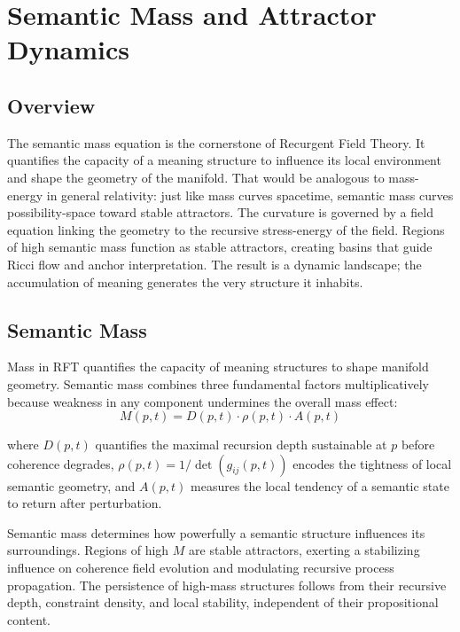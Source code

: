 \chapter{Semantic Mass and Attractor Dynamics}

\section{Overview}

The semantic mass equation is the cornerstone of Recurgent Field Theory. It quantifies the capacity of a meaning structure to influence its local environment and shape the geometry of the manifold. That would be analogous to mass-energy in general relativity: just like mass curves spacetime, semantic mass curves possibility-space toward stable attractors. The curvature is governed by a field equation linking the geometry to the recursive stress-energy of the field. Regions of high semantic mass function as stable attractors, creating basins that guide Ricci flow and anchor interpretation. The result is a dynamic landscape; the accumulation of meaning generates the very structure it inhabits.

\section{Semantic Mass}

Mass in RFT quantifies the capacity of meaning structures to shape manifold geometry. Semantic mass combines three fundamental factors multiplicatively because weakness in any component undermines the overall mass effect:
\begin{equation}
M(p, t) = D(p, t) \cdot \rho(p, t) \cdot A(p, t)
\end{equation}

where \(D(p, t)\) quantifies the maximal recursion depth sustainable at \(p\) before coherence degrades, \(\rho(p, t) = 1/\det(g_{ij}(p, t))\) encodes the tightness of local semantic geometry, and \(A(p, t)\) measures the local tendency of a semantic state to return after perturbation.

Semantic mass determines how powerfully a semantic structure influences its surroundings. Regions of high \(M\) are stable attractors, exerting a stabilizing influence on coherence field evolution and modulating recursive process propagation. The persistence of high-mass structures follows from their recursive depth, constraint density, and local stability, independent of their propositional content.


